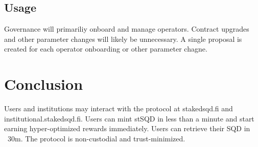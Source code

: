 \documentclass{article}
\begin{document}
\subsection{Usage}
Governance will primariliy onboard and manage operators. Contract upgrades and other parameter changes will likely be unnecessary. A single proposal is created for each operator onboarding or other parameter chagne. 
\section{Conclusion}
Users and institutions may interact with the protocol at stakedsqd.fi and institutional.stakedsqd.fi. Users can mint stSQD in less than a minute and start earning hyper-optimized rewards immediately. Users can retrieve their SQD in ~30m. The protocol is non-custodial and trust-minimized.
\printbibliography
\end{document}
